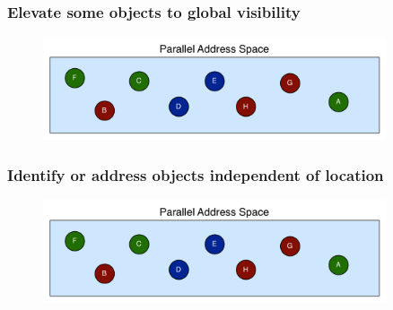\begin{frame}
  \frametitle{Elevate some objects to global visibility}
  \begin{figure}\includegraphics[width=0.9\textwidth]{../figures/objectGlobalAddress.pdf}\end{figure}
\end{frame}


\begin{frame}
  \frametitle{Identify or address objects independent of location}
  \begin{figure}\includegraphics[width=0.9\textwidth]{../figures/objectGlobalAddress.pdf}\end{figure}
\end{frame}


